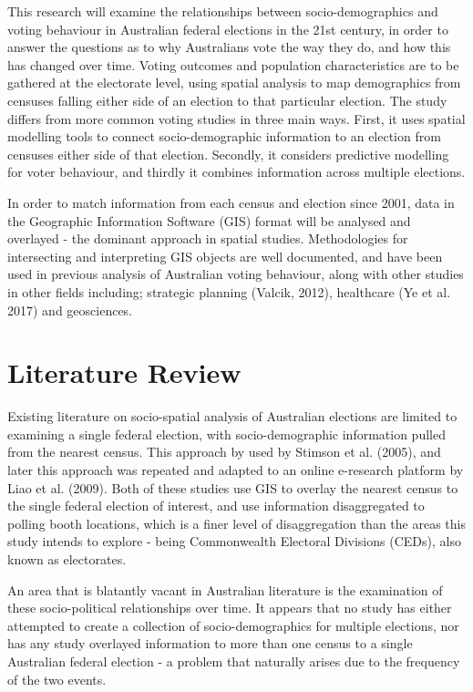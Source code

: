 \documentclass{monashthesis}
\begin{document}
This research will examine the relationships between socio-demographics
and voting behaviour in Australian federal elections in the 21st
century, in order to answer the questions as to why Australians vote the
way they do, and how this has changed over time. Voting outcomes and
population characteristics are to be gathered at the electorate level,
using spatial analysis to map demographics from censuses falling either
side of an election to that particular election. The study differs from
more common voting studies in three main ways. First, it uses spatial
modelling tools to connect socio-demographic information to an election
from censuses either side of that election. Secondly, it considers
predictive modelling for voter behaviour, and thirdly it combines
information across multiple elections.

In order to match information from each census and election since 2001,
data in the Geographic Information Software (GIS) format will be
analysed and overlayed - the dominant approach in spatial studies.
Methodologies for intersecting and interpreting GIS objects are well
documented, and have been used in previous analysis of Australian voting
behaviour, along with other studies in other fields including; strategic
planning (Valcik, 2012), healthcare (Ye et al. 2017) and geosciences.

\chapter{Literature Review}\label{ch:litreview}

Existing literature on socio-spatial analysis of Australian elections
are limited to examining a single federal election, with
socio-demographic information pulled from the nearest census. This
approach by used by Stimson et al. (2005), and later this approach was
repeated and adapted to an online e-research platform by Liao et al.
(2009). Both of these studies use GIS to overlay the nearest census to
the single federal election of interest, and use information
disaggregated to polling booth locations, which is a finer level of
disaggregation than the areas this study intends to explore - being
Commonwealth Electoral Divisions (CEDs), also known as electorates.

An area that is blatantly vacant in Australian literature is the
examination of these socio-political relationships over time. It appears
that no study has either attempted to create a collection of
socio-demographics for multiple elections, nor has any study overlayed
information to more than one census to a single Australian federal
election - a problem that naturally arises due to the frequency of the
two events.
\end{document}
